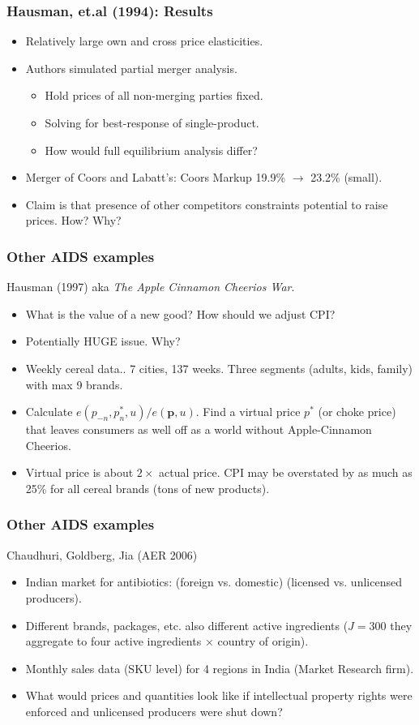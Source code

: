 \documentclass[xcolor=pdftex,dvipsnames,table,mathserif,aspectratio=169]{beamer}
\begin{document}
\begin{frame}
\frametitle{Hausman, et.al (1994): Results}
\begin{itemize}
\item Relatively large own and cross price elasticities.
\item Authors simulated \alert{partial merger analysis}.
\begin{itemize}
\item Hold prices of all non-merging parties fixed.
\item Solving for best-response of single-product.
\item How would full equilibrium analysis differ?
\end{itemize}
\item  Merger of Coors and Labatt's: Coors Markup 19.9\% $\rightarrow$ 23.2\% (small).
\item Claim is that presence of other competitors constraints potential to raise prices. How? Why?
\end{itemize}
\end{frame}

\begin{frame}
\frametitle{Other AIDS examples}
 Hausman (1997) aka \textit{The Apple Cinnamon Cheerios War}.
\begin{itemize}
\item What is the value of a new good? How should we adjust CPI?
\item Potentially HUGE issue. Why?
\item Weekly cereal data.. 7 cities, 137 weeks. Three segments (adults, kids, family) with max 9 brands.
\item Calculate $e(p_{-n},p_n^*,u) / e(\mathbf{p},u)$. Find a \alert{virtual price} $p^{*}$ (or choke price) that leaves consumers as well off as a world without Apple-Cinnamon Cheerios.
\item Virtual price is about $2 \times$ actual price. CPI may be overstated by as much as 25\% for all cereal brands (tons of new products).
\end{itemize}
\end{frame}

\begin{frame}
\frametitle{Other AIDS examples}
 Chaudhuri, Goldberg, Jia (AER 2006)
\begin{itemize}
\item Indian market for antibiotics: (foreign vs. domestic) (licensed vs. unlicensed producers).
\item Different brands, packages, etc. also different active ingredients ($J=300$ they aggregate to four active ingredients $\times$ country of origin).
\item Monthly sales data (SKU level) for 4 regions in India (Market Research firm).
\item What would prices and quantities look like if intellectual property rights were enforced and unlicensed producers were shut down?
\end{itemize}
\end{frame}
\end{document}
